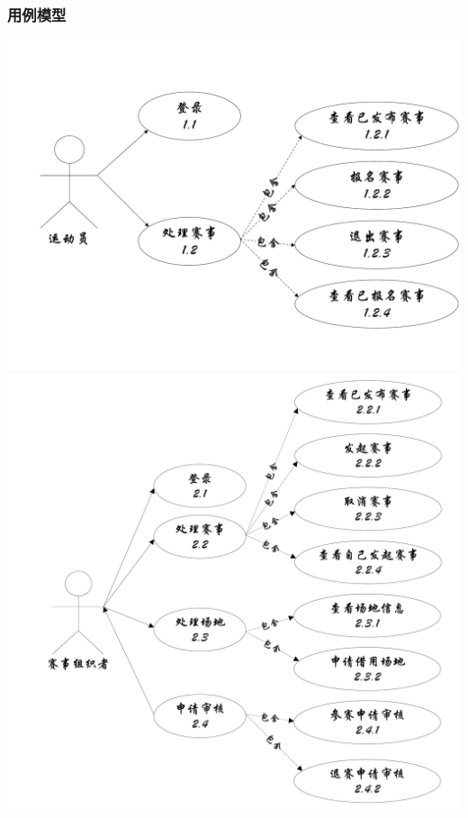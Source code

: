 \documentclass[a4paper,UTF8]{article}
\begin{document}
\subsubsection{用例模型}
{
	\centering\includegraphics[width=1\columnwidth]{uc1}
	\centering\includegraphics[width=1\columnwidth]{uc2}
}
\end{document}
